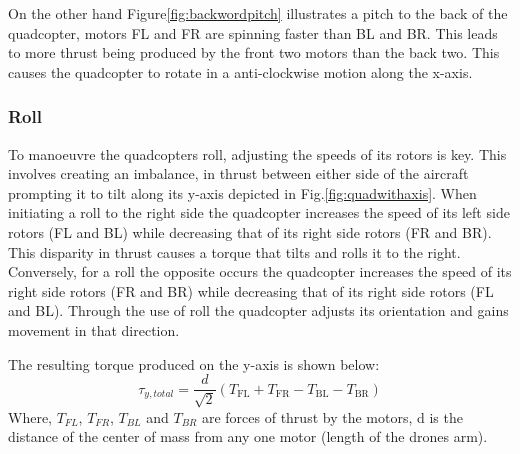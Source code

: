 \documentclass{article}
\begin{document}
On the other hand Figure\ref{fig:backwordpitch} illustrates a pitch to the back of the quadcopter, motors FL and FR are spinning faster than BL and BR. This leads to more thrust being produced by the front two motors than the back two. This causes the quadcopter to rotate in a anti-clockwise motion along the x-axis.

\subsubsection{Roll}
To manoeuvre the quadcopters roll, adjusting the speeds of its rotors is key. This involves creating an imbalance, in thrust between either side of the aircraft prompting it to tilt along its  y-axis depicted in Fig.\ref{fig:quadwithaxis}.
When initiating a roll to the right side the quadcopter increases the speed of its left side rotors (FL and BL) while decreasing that of its right side rotors (FR and BR). This disparity in thrust causes a torque that tilts and rolls it to the right. Conversely, for a roll the opposite occurs the 
quadcopter increases the speed of its right side rotors (FR and BR) while decreasing that of its right side rotors (FL and BL).
Through the use of roll the quadcopter adjusts its orientation and gains movement in that direction. 

The resulting torque produced on the y-axis is shown below:
\begin{equation}
  \tau_{y, total} = \frac{d}{\sqrt{2}} (T_{\text{FL}} + T_{\text{FR}} - T_{\text{BL}} - T_{\text{BR}})
  \label{torque_y}
\end{equation}
Where, \(T_{FL}\),  \(T_{FR}\), \(T_{BL}\) and \(T_{BR}\) are forces of thrust by the motors, d is the distance of the center of mass from any one motor (length of the drones arm).
\end{document}
